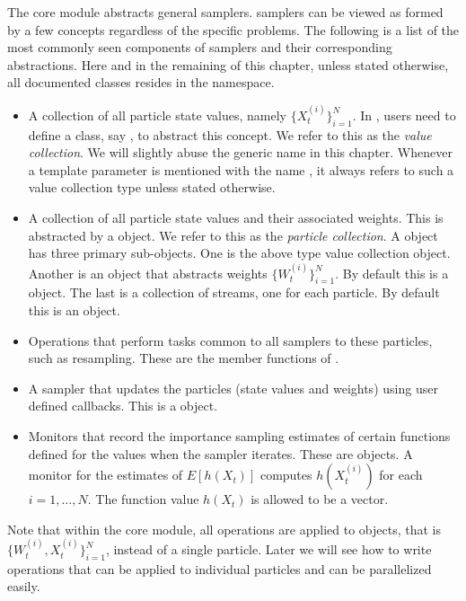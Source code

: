 The core module abstracts general \smc samplers. \smc samplers can be viewed
as formed by a few concepts regardless of the specific problems. The following
is a list of the most commonly seen components of \smc samplers and their
corresponding \vsmc abstractions. Here and in the remaining of this chapter,
unless stated otherwise, all documented classes resides in the
 namespace.
\begin{itemize}
  \item A collection of all particle state values, namely
    $\{X_t^{(i)}\}_{i=1}^N$. In \vsmc, users need to define a class, say
    , to abstract this concept. We refer to this as the
    \emph{value collection}. We will slightly abuse the generic name
     in this chapter. Whenever a template parameter is mentioned
    with the name , it always refers to such a value collection
    type unless stated otherwise.
  \item A collection of all particle state values and their associated
    weights. This is abstracted by a  object. We refer
    to this as the \emph{particle collection}. A 
    object has three primary sub-objects. One is the above type 
    value collection object. Another is an object that abstracts weights
    $\{W_t^{(i)}\}_{i=1}^N$. By default this is a 
    object. The last is a collection of \rng streams, one for each particle.
    By default this is an  object.
  \item Operations that perform tasks common to all samplers to these
    particles, such as resampling. These are the member functions of
    .
  \item A sampler that updates the particles (state values and weights) using
    user defined callbacks. This is a  object.
  \item Monitors that record the importance sampling estimates of certain
    functions defined for the values when the sampler iterates. These are
     objects. A monitor for the estimates of $E[h(X_t)]$
    computes $h(X_t^{(i)})$ for each $i = 1,\dots,N$. The function value
    $h(X_t)$ is allowed to be a vector.
\end{itemize}
Note that within the core module, all operations are applied to
 objects, that is $\{W_t^{(i)},X_t^{(i)}\}_{i=1}^N$,
instead of a single particle. Later we will see how to write operations that
can be applied to individual particles and can be parallelized easily.

